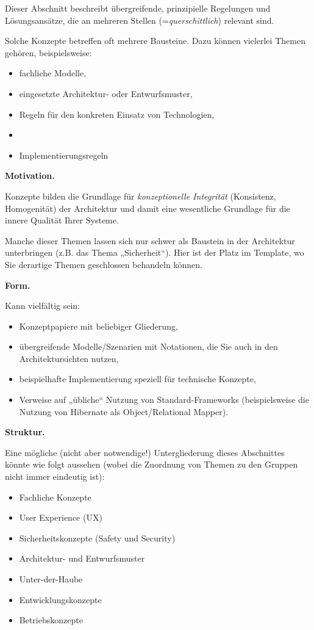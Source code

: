 \documentclass[]{article}
\begin{document}
Dieser Abschnitt beschreibt übergreifende, prinzipielle Regelungen und
Lösungsansätze, die an mehreren Stellen (=\emph{querschittlich})
relevant sind.

Solche Konzepte betreffen oft mehrere Bausteine. Dazu können vielerlei
Themen gehören, beispielsweise:

\begin{itemize}
\item
  fachliche Modelle,
\item
  eingesetzte Architektur- oder Entwurfsmuster,
\item
  Regeln für den konkreten Einsatz von Technologien,
\item
\item
  Implementierungsregeln
\end{itemize}

\textbf{Motivation.}

Konzepte bilden die Grundlage für \emph{konzeptionelle Integrität}
(Konsistenz, Homogenität) der Architektur und damit eine wesentliche
Grundlage für die innere Qualität Ihrer Systeme.

Manche dieser Themen lassen sich nur schwer als Baustein in der
Architektur unterbringen (z.B. das Thema „Sicherheit``). Hier ist der
Platz im Template, wo Sie derartige Themen geschlossen behandeln können.

\textbf{Form.}

Kann vielfältig sein:

\begin{itemize}
\item
  Konzeptpapiere mit beliebiger Gliederung,
\item
  übergreifende Modelle/Szenarien mit Notationen, die Sie auch in den
  Architektursichten nutzen,
\item
  beispielhafte Implementierung speziell für technische Konzepte,
\item
  Verweise auf „übliche`` Nutzung von Standard-Frameworks
  (beispielsweise die Nutzung von Hibernate als Object/Relational
  Mapper).
\end{itemize}

\textbf{Struktur.}

Eine mögliche (nicht aber notwendige!) Untergliederung dieses
Abschnittes könnte wie folgt aussehen (wobei die Zuordnung von Themen zu
den Gruppen nicht immer eindeutig ist):

\begin{itemize}
\item
  Fachliche Konzepte
\item
  User Experience (UX)
\item
  Sicherheitskonzepte (Safety und Security)
\item
  Architektur- und Entwurfsmuster
\item
  Unter-der-Haube
\item
  Entwicklungskonzepte
\item
  Betriebskonzepte
\end{itemize}
\end{document}
